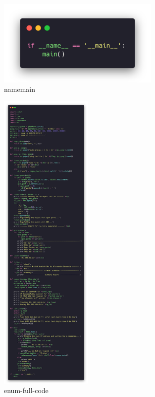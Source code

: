 \begin{figure}[H]
  \centering
  \includegraphics[width=0.7\textwidth]{figures/code/namemain}
  \caption{namemain}
  \label{f:namemain}
\end{figure}

\begin{figure}[H]
  \centering
  \includegraphics[width=0.4\textwidth]{figures/code/enum-full-code}
  \caption{enum-full-code}
  \label{f:enum-full-code}
\end{figure}
